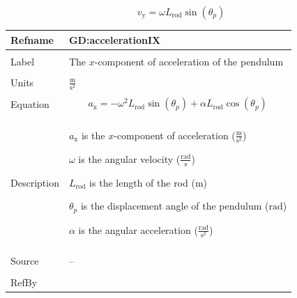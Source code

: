 \documentclass[12pt]{article}
\begin{document}
\begin{displaymath}
{v_{\text{y}}}=ω {L_{\text{rod}}} \sin\left({θ_{p}}\right)
\end{displaymath}
\vspace{\baselineskip}
\noindent
\begin{minipage}{\textwidth}
\begin{tabular}{>{\raggedright}p{}>{\raggedright\arraybackslash}p{}}
\toprule \textbf{Refname} & \textbf{GD:accelerationIX}
\label{GD:accelerationIX}
\\ \midrule \\
Label & The $x$-component of acceleration of the pendulum
        
\\ \midrule \\
Units & $\frac{\text{m}}{\text{s}^{2}}$
        
\\ \midrule \\
Equation & \begin{displaymath}
           {a_{\text{x}}}=-ω^{2} {L_{\text{rod}}} \sin\left({θ_{p}}\right)+α {L_{\text{rod}}} \cos\left({θ_{p}}\right)
           \end{displaymath}
\\ \midrule \\
Description & \begin{symbDescription}
              \item{${a_{\text{x}}}$ is the $x$-component of acceleration ($\frac{\text{m}}{\text{s}^{2}}$)}
              \item{$ω$ is the angular velocity ($\frac{\text{rad}}{\text{s}}$)}
              \item{${L_{\text{rod}}}$ is the length of the rod (${\text{m}}$)}
              \item{${θ_{p}}$ is the displacement angle of the pendulum (${\text{rad}}$)}
              \item{$α$ is the angular acceleration ($\frac{\text{rad}}{\text{s}^{2}}$)}
              \end{symbDescription}
\\ \midrule \\
Source & --
         
\\ \midrule \\
RefBy & 
\\ \bottomrule
\end{tabular}
\end{minipage}
\end{document}
